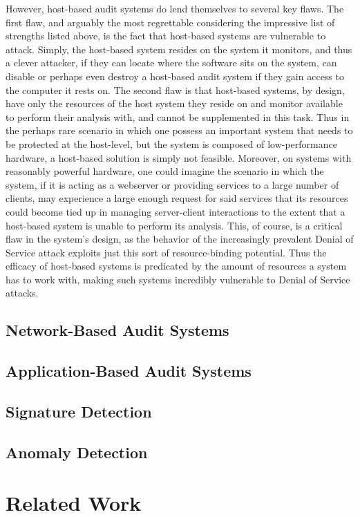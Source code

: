 \documentclass{acm_proc_article-sp}
\begin{document}
    However, host-based audit systems do lend themselves to several key flaws. The first flaw, and arguably the most regrettable considering the impressive list of strengths listed above, is the fact that host-based systems are vulnerable to attack. Simply, the host-based system resides on the system it monitors, and thus a clever attacker, if they can locate where the software sits on the system, can disable or perhaps even destroy a host-based audit system if they gain access to the computer it rests on. The second flaw is that host-based systems, by design, have only the resources of the host system they reside on and monitor available to perform their analysis with, and cannot be supplemented in this task. Thus in the perhaps rare scenario in which one possess an important system that needs to be protected at the host-level, but the system is composed of low-performance hardware, a host-based solution is simply not feasible. Moreover, on systems with reasonably powerful hardware, one could imagine the scenario in which the system, if it is acting as a webserver or providing services to a large number of clients, may experience a large enough request for said services that its resources could become tied up in managing server-client interactions to the extent that a host-based system is unable to perform its analysis. This, of course, is a critical flaw in the system's design, as the behavior of the increasingly prevalent Denial of Service attack exploits just this sort of resource-binding potential. Thus the efficacy of host-based systems is predicated by the amount of resources a system has to work with, making such systems incredibly vulnerable to Denial of Service attacks.
    \subsection{Network-Based Audit Systems}
    \subsection{Application-Based Audit Systems}
    \subsection{Signature Detection}
    \subsection{Anomaly Detection}
\section{Related Work}
\end{document}
